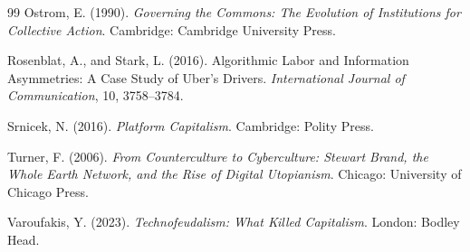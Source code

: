 \documentclass[11pt]{article}
\theoremstyle{plain}
\theoremstyle{definition}
\begin{document}
\begin{thebibliography}{99}
Ostrom, E. (1990). \emph{Governing the Commons: The Evolution of Institutions for Collective Action}. Cambridge: Cambridge University Press.

Rosenblat, A., and Stark, L. (2016). Algorithmic Labor and Information Asymmetries: A Case Study of Uber's Drivers. \emph{International Journal of Communication}, 10, 3758--3784.

Srnicek, N. (2016). \emph{Platform Capitalism}. Cambridge: Polity Press.

Turner, F. (2006). \emph{From Counterculture to Cyberculture: Stewart Brand, the Whole Earth Network, and the Rise of Digital Utopianism}. Chicago: University of Chicago Press.

Varoufakis, Y. (2023). \emph{Technofeudalism: What Killed Capitalism}. London: Bodley Head.

\end{thebibliography}
\end{document}
